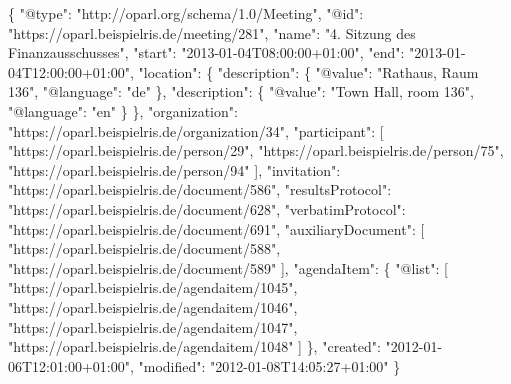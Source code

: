 \documentclass[,a4paper]{article}
\newenvironment{Shaded}{}{}
\newcommand{\DataTypeTok}[1]{\textcolor[rgb]{0.56,0.13,0.00}{{#1}}}
\newcommand{\StringTok}[1]{\textcolor[rgb]{0.25,0.44,0.63}{{#1}}}
\newcommand{\NormalTok}[1]{{#1}}
\begin{document}
\begin{Shaded}
\begin{Highlighting}[]
\NormalTok{\{}
    \DataTypeTok{"@type"}\NormalTok{: }\StringTok{"http://oparl.org/schema/1.0/Meeting"}\NormalTok{,}
    \DataTypeTok{"@id"}\NormalTok{: }\StringTok{"https://oparl.beispielris.de/meeting/281"}\NormalTok{,}
    \DataTypeTok{"name"}\NormalTok{: }\StringTok{"4. Sitzung des Finanzausschusses"}\NormalTok{,}
    \DataTypeTok{"start"}\NormalTok{: }\StringTok{"2013-01-04T08:00:00+01:00"}\NormalTok{,}
    \DataTypeTok{"end"}\NormalTok{: }\StringTok{"2013-01-04T12:00:00+01:00"}\NormalTok{,}
    \DataTypeTok{"location"}\NormalTok{: \{}
        \DataTypeTok{"description"}\NormalTok{: \{}
            \DataTypeTok{"@value"}\NormalTok{: }\StringTok{"Rathaus, Raum 136"}\NormalTok{,}
            \DataTypeTok{"@language"}\NormalTok{: }\StringTok{"de"}
        \NormalTok{\},}
        \DataTypeTok{"description"}\NormalTok{: \{}
            \DataTypeTok{"@value"}\NormalTok{: }\StringTok{"Town Hall, room 136"}\NormalTok{,}
            \DataTypeTok{"@language"}\NormalTok{: }\StringTok{"en"}
        \NormalTok{\}}
    \NormalTok{\},}
    \DataTypeTok{"organization"}\NormalTok{: }\StringTok{"https://oparl.beispielris.de/organization/34"}\NormalTok{,}
    \DataTypeTok{"participant"}\NormalTok{: [}
        \StringTok{"https://oparl.beispielris.de/person/29"}\NormalTok{,}
        \StringTok{"https://oparl.beispielris.de/person/75"}\NormalTok{,}
        \StringTok{"https://oparl.beispielris.de/person/94"}
    \NormalTok{],}
    \DataTypeTok{"invitation"}\NormalTok{: }\StringTok{"https://oparl.beispielris.de/document/586"}\NormalTok{,}
    \DataTypeTok{"resultsProtocol"}\NormalTok{: }\StringTok{"https://oparl.beispielris.de/document/628"}\NormalTok{,}
    \DataTypeTok{"verbatimProtocol"}\NormalTok{: }\StringTok{"https://oparl.beispielris.de/document/691"}\NormalTok{,}
    \DataTypeTok{"auxiliaryDocument"}\NormalTok{: [}
        \StringTok{"https://oparl.beispielris.de/document/588"}\NormalTok{,}
        \StringTok{"https://oparl.beispielris.de/document/589"}
    \NormalTok{],}
    \DataTypeTok{"agendaItem"}\NormalTok{: \{}
        \DataTypeTok{"@list"}\NormalTok{: [}
            \StringTok{"https://oparl.beispielris.de/agendaitem/1045"}\NormalTok{,}
            \StringTok{"https://oparl.beispielris.de/agendaitem/1046"}\NormalTok{,}
            \StringTok{"https://oparl.beispielris.de/agendaitem/1047"}\NormalTok{,}
            \StringTok{"https://oparl.beispielris.de/agendaitem/1048"}
        \NormalTok{]}
    \NormalTok{\},}
    \DataTypeTok{"created"}\NormalTok{: }\StringTok{"2012-01-06T12:01:00+01:00"}\NormalTok{,}
    \DataTypeTok{"modified"}\NormalTok{: }\StringTok{"2012-01-08T14:05:27+01:00"}
\NormalTok{\}}
\end{Highlighting}
\end{Shaded}
\end{document}
